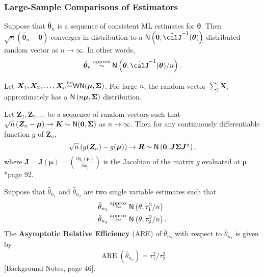 \subsubsection*{Large-Sample Comparisons of Estimators}

\begin{thm} \label{thm: large_samp_est}
    Suppose that $\hat{\bm{\theta}}_n$ is a sequence of consistent ML estimates for $\bm{\theta}$. Then $\sqrt{n} \left( \hat{\bm{\theta}}_n - \bm{\theta} \right)$ converges in distribution to a $\Nor \left( \bm{0} , \mathring{\calJ}^{-1} (\bm{\theta}) \right)$ distributed random vector as $n \to \infty$. In other words,
    \begin{align*}
        \hat{\bm{\theta}}_n \overset{\text{approx}}{\sim} \Nor \left( \bm{\theta} , \mathring{\calJ}^{-1} (\bm{\theta}) / n \right) .
    \end{align*}
\end{thm}

\begin{thm} \label{thm: mv_cen_lim_thrm}
    Let $\bm{X}_1 , \bm{X}_2 , \ldots , \bm{X}_n {\overset{\text{iid}}{\sim}} {\sf WN} (\bm{\mu} , \bm{\Sigma})$. For large $n$, the random vector $\sum_{i} \bm{X}_i$ approximately has a ${\sf N} \left( n \bm{\mu} , \bm{\Sigma} \right)$ distribution. 
\end{thm}

\begin{thm} \label{thm: delta_ethod}
    Let $\bm{Z}_1 , \bm{Z}_2 , \ldots $ be a sequence of random vectors such that $\sqrt{n} \left( \bm{Z}_{n} - \bm{\mu} \right) \to \bm{K} \sim {\sf N} (\bm{0} , \bm{\Sigma})$ as $n \to \infty$. Then for any continuously differentiable function $g$ of $\bm{Z}_{n}$,
    \begin{equation*}
        \sqrt{n} \left( g (\bm{Z}_n) - g (\bm{\mu}) \right) \to \bm{R} \sim {\sf N} \left( \bm{0} , \bm{J} \bm{\Sigma} \bm{J}^{\intercal} \right),
    \end{equation*}
    where $\bm{J} = \bm{J} (\bm{\mu}) = \left( \frac{\partial g_i (\bm{\mu})}{\partial x_j} \right)$ is the Jacobian of the matrix $g$ evaluated at $\bm{\mu}$ \cite{KroeseDirkP2013SMaC}*{page 92}.
\end{thm}

\begin{defe} \label{defe: are}
    Suppose that $\hat{\theta}_{n_1}$ and $\hat{\theta}_{n_2}$ are two single variable estimates such that
    \begin{align*}
        \hat{\theta}_{n_1} & \overset{\text{approx}}{\sim} {\sf N} \left( \theta , \tau_1^2 / n \right)  \\
        \hat{\theta}_{n_2} & \overset{\text{approx}}{\sim} {\sf N} \left( \theta , \tau_2^2 / n \right).
    \end{align*}
    The {\bf Asymptotic Relative Efficiency} (ARE) of $\hat{\theta}_{n_2}$ with respect to $\hat{\theta}_{n_1}$ is given by
    \begin{equation*}
        \operatorname{ARE} (\hat{\theta}_{n_2}) = \tau_1^2 / \tau_2^2
    \end{equation*}
    [Background Notes, page 46].
\end{defe}

